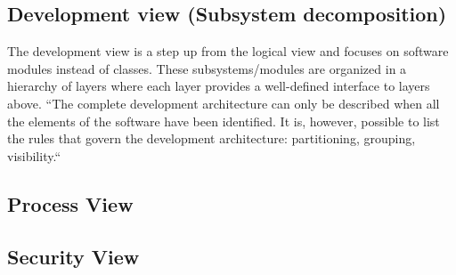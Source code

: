 \subsection{Development view (Subsystem decomposition)}
The development view is a step up from the logical view and focuses on software modules instead of classes. These subsystems/modules are organized in a hierarchy of layers where each layer provides a well-defined interface to layers above. “The complete development architecture can only be described when all the elements of the software have been identified. It is, however, possible to list the rules that govern the development architecture: partitioning, grouping, visibility.“
\subsection{Process View}
\subsection{Security View}

